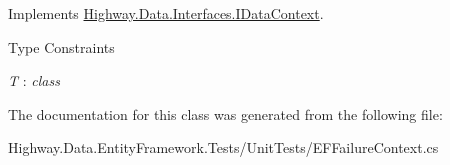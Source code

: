 Implements \hyperlink{interface_highway_1_1_data_1_1_interfaces_1_1_i_data_context_a54acc7026404f8426c0e1efe6accaf26}{Highway.\-Data.\-Interfaces.\-I\-Data\-Context}.

\begin{Desc}
\item[Type Constraints]\begin{description}
\item[{\em T} : {\em class}]\end{description}
\end{Desc}


The documentation for this class was generated from the following file\-:\begin{DoxyCompactItemize}
\item 
Highway.\-Data.\-Entity\-Framework.\-Tests/\-Unit\-Tests/E\-F\-Failure\-Context.\-cs\end{DoxyCompactItemize}
